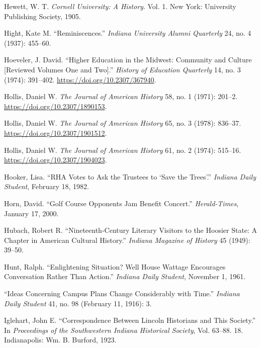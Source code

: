 \documentclass[
  american,
  letterpaper,
]{scrreprt}
\newlength{\cslhangindent}
\newenvironment{CSLReferences}[2] %
 {\begin{list}{}{%
  \setlength{\itemindent}{0pt}
  \setlength{\leftmargin}{0pt}
  \setlength{\parsep}{0pt}
  \ifodd #1
   \setlength{\leftmargin}{\cslhangindent}
   \setlength{\itemindent}{-1\cslhangindent}
  \fi
  \setlength{\itemsep}{#2\baselineskip}}}
 {\end{list}}
\begin{document}
\begin{CSLReferences}{1}{0}
Hewett, W. T. \emph{Cornell University: A History}. Vol. 1. New York:
University Publishing Society, 1905.

Hight, Kate M. {``Reminiscences.''} \emph{Indiana University Alumni
Quarterly} 24, no. 4 (1937): 455--60.

Hoeveler, J. David. {``Higher Education in the Midwest: Community and
Culture {[}Reviewed Volumes One and Two{]}.''} \emph{History of
Education Quarterly} 14, no. 3 (1974): 391--402.
\url{https://doi.org/10.2307/367940}.

Hollis, Daniel W. \emph{The Journal of American History} 58, no. 1
(1971): 201--2. \url{https://doi.org/10.2307/1890153}.

Hollis, Daniel W. \emph{The Journal of American History} 65, no. 3
(1978): 836--37. \url{https://doi.org/10.2307/1901512}.

Hollis, Daniel W. \emph{The Journal of American History} 61, no. 2
(1974): 515--16. \url{https://doi.org/10.2307/1904023}.

Hooker, Lisa. {``RHA Votes to Ask the Trustees to {`Save the Trees'}.''}
\emph{Indiana Daily Student}, February 18, 1982.

Horn, David. {``Golf Course Opponents Jam Benefit Concert.''}
\emph{Herald-Times}, January 17, 2000.

Hubach, Robert R. {``Nineteenth-Century Literary Visitors to the Hoosier
State: A Chapter in American Cultural History.''} \emph{Indiana Magazine
of History} 45 (1949): 39--50.

Hunt, Ralph. {``Enlightening Situation? Well House Wattage Encourages
Conversation Rather Than Action.''} \emph{Indiana Daily Student},
November 1, 1961.

{``Ideas Concerning Campus Plans Change Considerably with Time.''}
\emph{Indiana Daily Student} 41, no. 98 (February 11, 1916): 3.

Iglehart, John E. {``Correspondence Between Lincoln Historians and This
Society.''} In \emph{Proceedings of the Southwestern Indiana Historical
Society}, Vol. 63--88. 18. Indianapolis: Wm. B. Burford, 1923.


\end{CSLReferences}
\end{document}
